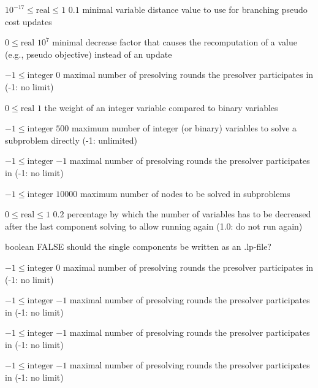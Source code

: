 %
{$10^{-17}\leq\textrm{real}\leq1$}%
{$0.1$}%
{minimal variable distance value to use for branching pseudo cost updates}%
{}

%
{$0\leq\textrm{real}$}%
{$10^{  7}$}%
{minimal decrease factor that causes the recomputation of a value (e.g., pseudo objective) instead of an update}%
{}

%
{$-1\leq\textrm{integer}$}%
{$0$}%
{maximal number of presolving rounds the presolver participates in (-1: no limit)}%
{}

%
{$0\leq\textrm{real}$}%
{$1$}%
{the weight of an integer variable compared to binary variables}%
{}

%
{$-1\leq\textrm{integer}$}%
{$500$}%
{maximum number of integer (or binary) variables to solve a subproblem directly (-1: unlimited)}%
{}

%
{$-1\leq\textrm{integer}$}%
{$-1$}%
{maximal number of presolving rounds the presolver participates in (-1: no limit)}%
{}

%
{$-1\leq\textrm{integer}$}%
{$10000$}%
{maximum number of nodes to be solved in subproblems}%
{}

%
{$0\leq\textrm{real}\leq1$}%
{$0.2$}%
{percentage by which the number of variables has to be decreased after the last component solving to allow running again (1.0: do not run again)}%
{}

%
{boolean}%
{FALSE}%
{should the single components be written as an .lp-file?}%
{}

%
{$-1\leq\textrm{integer}$}%
{$0$}%
{maximal number of presolving rounds the presolver participates in (-1: no limit)}%
{}

%
{$-1\leq\textrm{integer}$}%
{$-1$}%
{maximal number of presolving rounds the presolver participates in (-1: no limit)}%
{}

%
{$-1\leq\textrm{integer}$}%
{$-1$}%
{maximal number of presolving rounds the presolver participates in (-1: no limit)}%
{}

%
{$-1\leq\textrm{integer}$}%
{$-1$}%
{maximal number of presolving rounds the presolver participates in (-1: no limit)}%
{}

